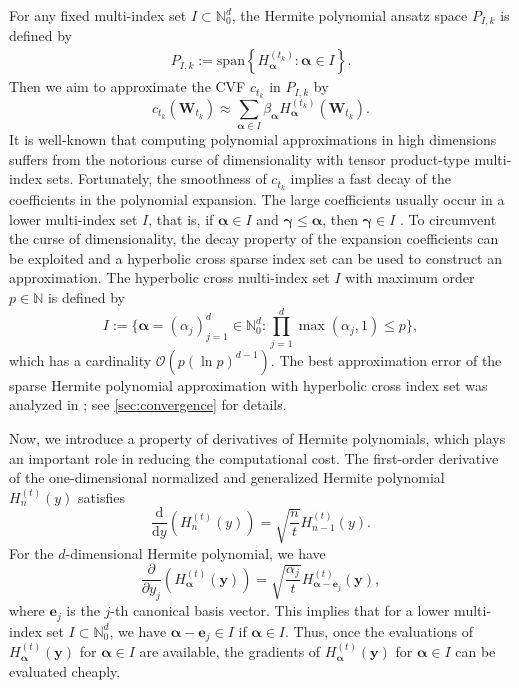 \documentclass[10pt,a4paper]{amsart}
\numberwithin{equation}{section}
\numberwithin{algorithm}{section}
\theoremstyle{plain}
\theoremstyle{remark}
\begin{document}
For any fixed multi-index set $I \subset \mathbb{N}_0^d$, the Hermite polynomial ansatz space $P_{I,k}$ is defined by
\begin{align}\label{eq:pkI}
P_{I,k}:=\text{span}\left\{H_{\bm{\alpha}}^{(t_k)}: \bm{\alpha} \in I\right\}.
\end{align}
Then we aim to approximate the CVF $ c_{t_k}$ in $P_{I,k}$ by
\begin{equation*}
    c_{t_k}(\mathbf{W}_{t_k}) \approx \sum_{\bm{\alpha}\in I} \beta_{\bm{\alpha}} H_{\bm{\alpha}}^{(t_k)}(\mathbf{W}_{t_k}).
\end{equation*}
It is well-known that computing polynomial approximations in high dimensions suffers from the notorious curse of dimensionality with tensor product-type multi-index sets. Fortunately, the smoothness of $c_{t_k}$ implies a fast decay of the coefficients in the polynomial expansion. The large coefficients usually occur in a lower multi-index set $I$, that is, if $\bm{\alpha}\in I$ and $\bm{\gamma} \le \bm{\alpha}$, then $\bm{\gamma}\in I$ \cite[Section 1.5]{adcock2022sparse}. To circumvent the curse of dimensionality,  the decay property of the expansion coefficients can be exploited and a hyperbolic cross sparse index set can be used to construct an approximation. The hyperbolic cross multi-index set $I$ with maximum order $p\in \mathbb{N}$ is defined by
\begin{equation} \label{eq:HC-defi}
    I := \Big\{\bm{\alpha} = (\alpha_j)_{j=1}^d \in \mathbb{N}_0^d: \prod_{j=1}^d \max(\alpha_j, 1) \le p\Big\},
\end{equation}
which has a cardinality $\mathcal{O}(p(\ln p)^{d-1})$. The best approximation error of the sparse Hermite polynomial approximation with hyperbolic cross index set was analyzed in \cite{luo2018error}; see \cref{sec:convergence} for details.

Now, we introduce a property of derivatives of Hermite polynomials, which plays an important role in reducing the computational cost. The first-order derivative of the one-dimensional normalized and generalized Hermite polynomial $H_n^{(t)}(y)$ satisfies
\begin{equation*}
    \frac{\mathrm{d}}{\mathrm{d}y}\left(H_n^{(t)}(y)\right) = \sqrt{\frac{n}{t}} H_{n-1}^{(t)}(y).
\end{equation*}
For the $d$-dimensional Hermite polynomial, we have
\begin{equation} \label{eq:derivative_herm}
    \frac{\partial}{\partial y_j}\left( H_{\bm{\alpha}}^{(t)}(\mathbf{y}) \right) = \sqrt{\frac{\alpha_j}{t}} H_{\bm{\alpha} - \mathbf{e}_j}^{(t)}(\mathbf{y}),
\end{equation}
where $\mathbf{e}_j$ is the $j$-th canonical basis vector. This implies that for a lower multi-index set $I \subset \mathbb{N}_0^d$, we have $\bm{\alpha} - \mathbf{e}_j \in I$ if $\bm{\alpha}\in I$. Thus, once the evaluations of $H_{\bm{\alpha}}^{(t)}(\mathbf{y})$ for $\bm{\alpha}\in I$ are available, the gradients of $H_{\bm{\alpha}}^{(t)}(\mathbf{y})$ for $\bm{\alpha}\in I$ can be evaluated cheaply.
\end{document}
